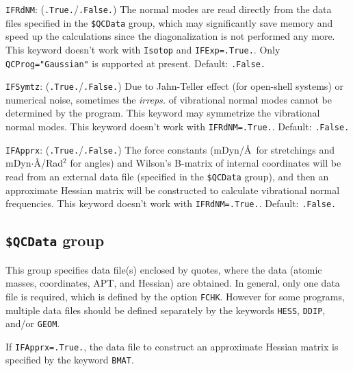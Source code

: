 \documentclass[12pt,english]{extarticle}
\begin{document}
\bigskip{}\bigskip{}
\verb|IFRdNM|: (\verb|.True.|/\verb|.False.|) The normal modes are read directly from the data files specified in the \texttt{\$QCData} group, which may significantly save memory and speed up the calculations since the diagonalization is not performed any more. This keyword
doesn't work with \verb|Isotop| and \verb|IFExp=.True.|. Only \verb|QCProg="Gaussian"| is supported at present. Default: \verb|.False.|

\bigskip{}\bigskip{}
\verb|IFSymtz|: (\verb|.True.|/\verb|.False.|) Due to Jahn-Teller effect (for open-shell systems) or numerical noise, sometimes the \textit{irreps.} of vibrational normal modes cannot be determined by the program. This keyword may symmetrize the vibrational normal modes.
This keyword doesn't work with \verb|IFRdNM=.True.|. Default: \verb|.False.|

\bigskip{}
\verb|IFApprx|: (\verb|.True.|/\verb|.False.|) The force constants (mDyn/\AA ~for stretchings and mDyn$\cdot$\AA/Rad$^2$ for angles) and Wilson's B-matrix of internal coordinates will be read from an external data file (specified in the \texttt{\$QCData} group), and then an approximate Hessian matrix will be constructed to calculate vibrational normal frequencies.  This keyword
doesn't work with \verb|IFRdNM=.True.|. Default: \verb|.False.|

\subsection{\texttt{\$QCData} group} \label{sec:inp-qcdata}

This group specifies data file(s) enclosed by quotes, where the data (atomic
masses, coordinates, APT, and Hessian) are obtained. In general,
only one data file is required, which is defined by the option
\verb|FCHK|. However for some programs, multiple data files should be
defined separately by the keywords \verb|HESS|, \verb|DDIP|, and/or
\verb|GEOM|.

If \verb|IFApprx=.True.|, the data file to construct an approximate Hessian matrix is specified by the keyword \verb|BMAT|.
\end{document}
